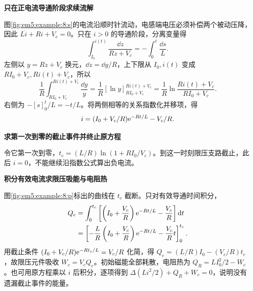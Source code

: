 \begin{solution}\textbf{只在正电流导通阶段求续流解}\par\nobreak
图\ref{fig:em5:example:8:s}的电流沿顺时针流动，电感端电压必须补偿两个被动压降，因此 $L\dot i+Ri+V_c=0$。只在 $i>0$ 的导通阶段，分离变量得
\[
 \int_{I_0}^{i(t)}\frac{\dd z}{Rz+V_c}=-\int_0^t\frac{\dd s}{L}.
\]
左侧以 $y=Rz+V_c$ 换元，$\dd z=\dd y/R$，上下限从 $I_0,i(t)$ 变成 $RI_0+V_c,Ri(t)+V_c$，所以
\[
 \frac1R\int_{RI_0+V_c}^{Ri(t)+V_c}\frac{\dd y}{y}
 =\frac1R[\ln y]_{RI_0+V_c}^{Ri(t)+V_c}
 =\frac1R\ln\frac{Ri(t)+V_c}{RI_0+V_c}.
\]
右侧为 $-[s]_0^t/L=-t/L$。将两侧相等的关系指数化并移项，得
\[i=(I_0+V_c/R)\mathrm e^{-Rt/L}-V_c/R.\]


\par\medskip{}\noindent\textbf{求第一次到零的截止事件并终止原方程}\par\nobreak
令它第一次到零，$t_c=(L/R)\ln(1+RI_0/V_c)$。到这一时刻限压支路截止，此后 $i=0$，不能继续沿指数公式算出负电流。



\par\medskip{}\noindent\textbf{积分有效电流求限压吸能与电阻热}\par\nobreak
图\ref{fig:em5:example:8:p}标出的曲线在 $t_c$ 截断。只对有效导通时间积分，
\[
 \begin{aligned}
 Q_e&=\int_0^{t_c}\left[\left(I_0+\frac{V_c}{R}\right)\mathrm e^{-Rt/L}-\frac{V_c}{R}\right]\mathop{}\!\mathrm d t\\
 &=\left[-\frac LR\left(I_0+\frac{V_c}{R}\right)\mathrm e^{-Rt/L}
 -\frac{V_c}{R}t\right]_0^{t_c}.
 \end{aligned}
\]
用截止条件 $(I_0+V_c/R)\mathrm e^{-Rt_c/L}=V_c/R$ 化简，得 $Q_e=(L/R)I_0-(V_c/R)t_c$，故限压元件吸收 $W_c=V_cQ_e$。初始磁能全部耗散，电阻热为 $Q_R=LI_0^2/2-W_c$。也可用原方程乘以 $i$ 后积分，逐项得到 $\Delta(Li^2/2)+Q_R+W_c=0$，说明没有遗漏截止事件的能量。




\end{solution}

